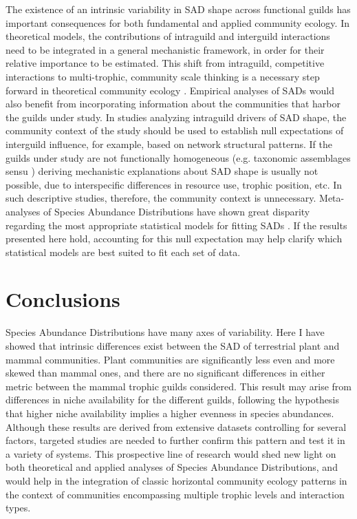 The existence of an intrinsic variability in SAD shape across functional guilds has important consequences for both fundamental and applied community ecology. In theoretical models, the contributions of intraguild and interguild interactions need to be integrated in a general mechanistic framework, in order for their relative importance to be estimated. This shift from intraguild, competitive interactions to multi-trophic, community scale thinking is a necessary step forward in theoretical community ecology \citep{Chesson2008,Godoy2018,Seibold2018}. Empirical analyses of SADs would also benefit from incorporating information about the communities that harbor the guilds under study. In studies analyzing intraguild drivers of SAD shape, the community context of the study should be used to establish null expectations of interguild influence, for example, based on network structural patterns. If the guilds under study are not functionally homogeneous (e.g. taxonomic assemblages sensu \citealt{Fauth1996}) deriving mechanistic explanations about SAD shape is usually not possible, due to interspecific differences in resource use, trophic position, etc. In such descriptive studies, therefore, the community context is unnecessary. Meta-analyses of Species Abundance Distributions have shown great disparity regarding the most appropriate statistical models for fitting SADs \citep{Ulrich2010,Baldridge2016}. If the results presented here hold, accounting for this null expectation may help clarify which statistical models are best suited to fit each set of data.

\section{Conclusions}

Species Abundance Distributions have many axes of variability. Here I have showed that intrinsic differences exist between the SAD of terrestrial plant and mammal communities. Plant communities are significantly less even and more skewed than mammal ones, and there are no significant differences in either metric between the mammal trophic guilds considered. This result may arise from differences in niche availability for the different guilds, following the hypothesis that higher niche availability implies a higher evenness in species abundances. Although these results are derived from extensive datasets controlling for several factors, targeted studies are needed to further confirm this pattern and test it in a variety of systems. This prospective line of research would shed new light on both theoretical and applied analyses of Species Abundance Distributions, and would help in the integration of classic horizontal community ecology patterns in the context of communities encompassing multiple trophic levels and interaction types.

